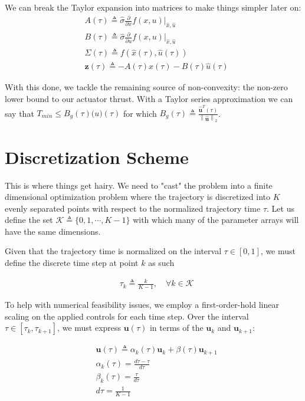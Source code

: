 We can break the Taylor expansion into matrices to make things simpler later on:
\begin{align}
& A(\tau) \triangleq \hat{\sigma} \frac{\partial}{\partial x} f(x,u) \bigg\rvert_{\hat{x},\hat{u}} \\
& B(\tau) \triangleq \hat{\sigma} \frac{\partial}{\partial u} f(x,u) \bigg\rvert_{\hat{x},\hat{u}} \\
& \Sigma(\tau) \triangleq f(\hat{x}(\tau),\hat{u}(\tau)) \\
& \mathbf{z}(\tau) \triangleq -A(\tau)\hat{x}(\tau) - B(\tau)\hat{u}(\tau)
\end{align}

With this done, we tackle the remaining source of non-convexity: the non-zero lower bound to our actuator thrust. With a Taylor series approximation we can say that $T_{min} \leq B_g(\tau)\mathbf(u)(\tau)$ for which $B_g(\tau) \triangleq \frac{\mathbf{\hat{u}}^T(\tau)}{\left\lVert \mathbf{\hat{u}} \right \lVert_2}$.



\section{Discretization Scheme}
This is where things get hairy. We need to "cast" the problem into a finite dimensional optimization problem where the trajectory is discretized into $K$ evenly separated points with respect to the normalized trajectory time $\tau$. Let us define the set $\mathcal{K}\triangleq \{0,1,\cdots, K-1\}$ with which many of the parameter arrays will have the same dimensions.

Given that the trajectory time is normalized on the interval $\tau \in [0,1 ]$, we must define the discrete time step at point $k$ as such

\begin{align}
& \tau_k \triangleq \frac{k}{K-1}, \quad \forall k \in \mathcal{K}
\end{align}

To help with numerical feasibility issues, we employ a first-order-hold linear scaling on the applied controls for each time step. Over the interval $\tau \in [\tau_k, \tau_{k+1}]$, we must express $\mathbf{u}(\tau)$ in terms of the $\mathbf{u}_k$
 and $\mathbf{u}_{k+1}$:

 \begin{align}
& \mathbf{u}(\tau) \triangleq \alpha_k(\tau) \mathbf{u}_k + \beta(\tau) \mathbf{u}_{k+1} \\ 
& \alpha_k(\tau) = \frac{d\tau - \tau}{d\tau} \\
& \beta_k(\tau) = \frac{\tau}{d\tau} \\
& d\tau = \frac{1}{K-1}
\end{align}

